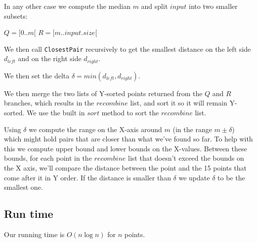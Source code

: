 \documentclass{tufte-handout}
\begin{document}
  In any other case we compute the median $m$ and split $input$ into two smaller subsets:\newline

  $Q = \lbrack 0..m \lbrack $\newline
  $R = \lbrack m..input.size \lbrack$ \newline 

  We then call \verb+ClosestPair+ recursively to get the smallest distance on the left side $d_{left}$ and on the right side $d_{right}$.

We then set the delta $\delta = min(d_{left}, d_{right})$.\newline

We then merge the two lists of Y-sorted points returned from the $Q$ and $R$ branches, which results in the $recombine$ list, and sort it so it will remain Y-sorted. We use the built in $sort$ method to sort the $recombine$ list.\newline

Using $\delta$ we compute the range on the X-axis around $m$ (in the range $m \pm \delta$) which might hold pairs that are closer than what we've found so far.
To help with this we compute upper bound and lower bounds on the X-values.\newline
 Between these bounds, for each point in the $recombine$ list that doesn't exceed the bounds on the X axis, we'll compare the distance between the point and the 15 points that come after it in Y order.
If the distance is smaller than $\delta$ we update $\delta$ to be the smallest one.

\subsection{Run time}
    Our running time is $O(n\log n)$ for $n$ points.
\end{document}
